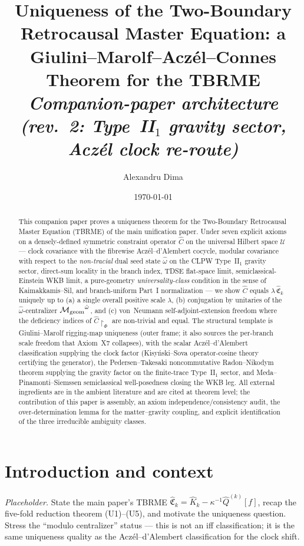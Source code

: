 \documentclass[11pt,a4paper]{article}
\title{Uniqueness of the Two-Boundary Retrocausal Master
Equation: a Giulini--Marolf--Acz\'el--Connes Theorem for the
TBRME\\
\large\emph{Companion-paper architecture (rev.~2: Type~II$_1$
gravity sector, Acz\'el clock re-route)}}
\author{Alexandru Dima}
\date{\today}
\theoremstyle{definition}
\theoremstyle{remark}
\newcommand{\MM}{\mathcal{M}}
\newcommand{\ctr}[1]{{#1}^{\hat\omega}}
\begin{document}
\maketitle

\begin{abstract}
This companion paper proves a uniqueness theorem for the
Two-Boundary Retrocausal Master Equation (TBRME) of the main
unification paper. Under seven explicit axioms on a
densely-defined symmetric constraint operator $\widehat C$ on
the universal Hilbert space $\mathcal U$ --- clock covariance
with the fibrewise Acz\'el--d'Alembert cocycle, modular
covariance with respect to the \emph{non-tracial} dual seed
state $\hat\omega$ on the CLPW Type~II$_1$ gravity sector,
direct-sum locality in the branch index, TDSE flat-space limit,
semiclassical-Einstein WKB limit, a pure-geometry
\emph{universality-class} condition in the sense of
Kaimakkamis--Sil, and branch-uniform Part~I normalization ---
we show $\widehat C$ equals $\lambda\,\widehat{\mathfrak C}_k$
uniquely up to (a) a single overall positive scale $\lambda$,
(b) conjugation by unitaries of the $\hat\omega$-centralizer
$\ctr{\MM_{\rm geom}}$, and (c) von~Neumann
self-adjoint-extension freedom where the deficiency indices of
$\widehat C\!\restriction_\Phi$ are non-trivial and equal. The
structural template is Giulini--Marolf rigging-map uniqueness
(outer frame; it also sources the per-branch scale freedom that
Axiom~X7 collapses), with the scalar Acz\'el--d'Alembert
classification supplying the clock factor (Kisy\'nski--Sova
operator-cosine theory certifying the generator), the
Pedersen--Takesaki noncommutative Radon--Nikodym theorem
supplying the gravity factor on the finite-trace Type~II$_1$
sector, and Meda--Pinamonti--Siemssen semiclassical
well-posedness closing the WKB leg. All external ingredients
are in the ambient literature and are cited at theorem level;
the contribution of this paper is assembly, an axiom
independence/consistency audit, the over-determination lemma
for the matter--gravity coupling, and explicit identification
of the three irreducible ambiguity classes.
\end{abstract}

\section{Introduction and context}
\label{sec:intro}

\emph{Placeholder.} State the main paper's TBRME
$\widehat{\mathfrak C}_k=\widehat K_k-\kappa^{-1}\widehat
Q^{(k)}[f]$, recap the five-fold reduction theorem (U1)--(U5),
and motivate the uniqueness question. Stress the ``modulo
centralizer'' status --- this is not an iff classification; it
is the same uniqueness quality as the Acz\'el--d'Alembert
classification for the clock shift.
\end{document}
